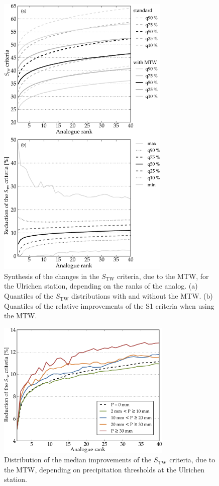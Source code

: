\documentclass[hess, manuscript]{copernicus}
\begin{document}
\begin{figure}[htb]
	\begin{center}
		\includegraphics[width=8.2cm]{figures/changes_S1_value_and_gain.pdf}
	\end{center}
	\caption{Synthesis of the changes in the $S_{\text{TW}}$ criteria, due to the MTW, for the Ulrichen station, depending on the ranks of the analog. (a) Quantiles of the $S_{\text{TW}}$ distributions with and without the MTW. (b) Quantiles of the relative improvements of the S1 criteria when using the MTW.}
	\label{fig:changes_S1}
\end{figure}

\begin{figure}[htb]
	\begin{center}
		\includegraphics[width=8.3cm]{figures/changes_S1_precip_threshold.pdf}
	\end{center}
	\caption{Distribution of the median improvements of the $S_{\text{TW}}$ criteria, due to the MTW, depending on precipitation thresholds at the Ulrichen station.}
	\label{fig:changes_S1_precip_threshold}
\end{figure}
\end{document}
